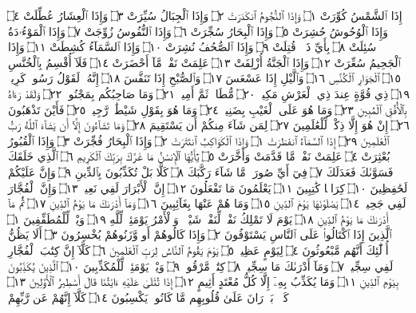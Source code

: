 إِذَا ٱلشَّمْسُ كُوِّرَتْ ۝١ وَإِذَا ٱلنُّجُومُ ٱنكَدَرَتْ ۝٢ وَإِذَا ٱلْجِبَالُ
سُيِّرَتْ ۝٣ وَإِذَا ٱلْعِشَارُ عُطِّلَتْ ۝٤ وَإِذَا ٱلْوُحُوشُ حُشِرَتْ ۝٥
وَإِذَا ٱلْبِحَارُ سُجِّرَتْ ۝٦ وَإِذَا ٱلنُّفُوسُ زُوِّجَتْ ۝٧ وَإِذَا ٱلْمَوْءُۥدَةُ
سُئِلَتْ ۝٨ بِأَيِّ ذَنۢبࣲ قُتِلَتْ ۝٩ وَإِذَا ٱلصُّحُفُ نُشِرَتْ ۝١٠
وَإِذَا ٱلسَّمَآءُ كُشِطَتْ ۝١١ وَإِذَا ٱلْجَحِيمُ سُعِّرَتْ ۝١٢ وَإِذَا ٱلْجَنَّةُ
أُزْلِفَتْ ۝١٣ عَلِمَتْ نَفْسࣱ مَّآ أَحْضَرَتْ ۝١٤ فَلَآ أُقْسِمُ بِٱلْخُنَّسِ ۝١٥
ٱلْجَوَارِ ٱلْكُنَّسِ ۝١٦ وَٱلَّيْلِ إِذَا عَسْعَسَ ۝١٧ وَٱلصُّبْحِ إِذَا تَنَفَّسَ ۝١٨
إِنَّهُۥ لَقَوْلُ رَسُولࣲ كَرِيمࣲ ۝١٩ ذِي قُوَّةٍ عِندَ ذِي ٱلْعَرْشِ مَكِينࣲ ۝٢٠ مُّطَاعࣲ ثَمَّ
أَمِينࣲ ۝٢١ وَمَا صَاحِبُكُم بِمَجْنُونࣲ ۝٢٢ وَلَقَدْ رَءَاهُ بِٱلْأُفُقِ ٱلْمُبِينِ ۝٢٣
وَمَا هُوَ عَلَى ٱلْغَيْبِ بِضَنِينࣲ ۝٢٤ وَمَا هُوَ بِقَوْلِ شَيْطَٰنࣲ رَّجِيمࣲ ۝٢٥
فَأَيْنَ تَذْهَبُونَ ۝٢٦ إِنْ هُوَ إِلَّا ذِكْرࣱ لِّلْعَٰلَمِينَ ۝٢٧ لِمَن شَآءَ مِنكُمْ أَن
يَسْتَقِيمَ ۝٢٨ وَمَا تَشَآءُونَ إِلَّآ أَن يَشَآءَ ٱللَّهُ رَبُّ ٱلْعَٰلَمِينَ ۝٢٩
إِذَا ٱلسَّمَآءُ ٱنفَطَرَتْ ۝١ وَإِذَا ٱلْكَوَاكِبُ ٱنتَثَرَتْ ۝٢ وَإِذَا ٱلْبِحَارُ
فُجِّرَتْ ۝٣ وَإِذَا ٱلْقُبُورُ بُعْثِرَتْ ۝٤ عَلِمَتْ نَفْسࣱ مَّا قَدَّمَتْ
وَأَخَّرَتْ ۝٥ يَٰٓأَيُّهَا ٱلْإِنسَٰنُ مَا غَرَّكَ بِرَبِّكَ ٱلْكَرِيمِ ۝٦ ٱلَّذِي
خَلَقَكَ فَسَوَّىٰكَ فَعَدَلَكَ ۝٧ فِيٓ أَيِّ صُورَةࣲ مَّا شَآءَ رَكَّبَكَ ۝٨
كَلَّا بَلْ تُكَذِّبُونَ بِٱلدِّينِ ۝٩ وَإِنَّ عَلَيْكُمْ لَحَٰفِظِينَ ۝١٠ كِرَامࣰا
كَٰتِبِينَ ۝١١ يَعْلَمُونَ مَا تَفْعَلُونَ ۝١٢ إِنَّ ٱلْأَبْرَارَ لَفِي نَعِيمࣲ ۝١٣ وَإِنَّ
ٱلْفُجَّارَ لَفِي جَحِيمࣲ ۝١٤ يَصْلَوْنَهَا يَوْمَ ٱلدِّينِ ۝١٥ وَمَا هُمْ عَنْهَا
بِغَآئِبِينَ ۝١٦ وَمَآ أَدْرَىٰكَ مَا يَوْمُ ٱلدِّينِ ۝١٧ ثُمَّ مَآ أَدْرَىٰكَ مَا يَوْمُ
ٱلدِّينِ ۝١٨ يَوْمَ لَا تَمْلِكُ نَفْسࣱ لِّنَفْسࣲ شَيْـࣰٔاۖ وَٱلْأَمْرُ يَوْمَئِذࣲ لِّلَّهِ ۝١٩
وَيْلࣱ لِّلْمُطَفِّفِينَ ۝١ ٱلَّذِينَ إِذَا ٱكْتَالُوا۟ عَلَى ٱلنَّاسِ يَسْتَوْفُونَ ۝٢
وَإِذَا كَالُوهُمْ أَو وَّزَنُوهُمْ يُخْسِرُونَ ۝٣ أَلَا يَظُنُّ أُو۟لَٰٓئِكَ أَنَّهُم مَّبْعُوثُونَ ۝٤
لِيَوْمٍ عَظِيمࣲ ۝٥ يَوْمَ يَقُومُ ٱلنَّاسُ لِرَبِّ ٱلْعَٰلَمِينَ ۝٦ كَلَّآ إِنَّ كِتَٰبَ
ٱلْفُجَّارِ لَفِي سِجِّينࣲ ۝٧ وَمَآ أَدْرَىٰكَ مَا سِجِّينࣱ ۝٨ كِتَٰبࣱ مَّرْقُومࣱ ۝٩
وَيْلࣱ يَوْمَئِذࣲ لِّلْمُكَذِّبِينَ ۝١٠ ٱلَّذِينَ يُكَذِّبُونَ بِيَوْمِ ٱلدِّينِ ۝١١ وَمَا يُكَذِّبُ
بِهِۦٓ إِلَّا كُلُّ مُعْتَدٍ أَثِيمٍ ۝١٢ إِذَا تُتْلَىٰ عَلَيْهِ ءَايَٰتُنَا قَالَ أَسَٰطِيرُ ٱلْأَوَّلِينَ ۝١٣
كَلَّاۖ بَلْ͏ۜ رَانَ عَلَىٰ قُلُوبِهِم مَّا كَانُوا۟ يَكْسِبُونَ ۝١٤ كَلَّآ إِنَّهُمْ عَن رَّبِّهِمْ
